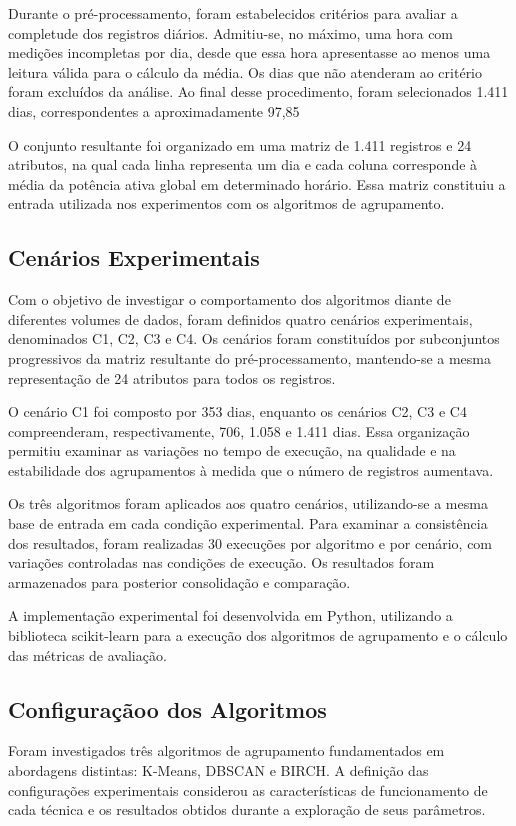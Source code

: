 \documentclass[lettersize,journal]{IEEEtran}
\begin{document}
Durante o pré-processamento, foram estabelecidos critérios para avaliar a completude dos registros diários. Admitiu-se, no máximo, uma hora com medições incompletas por dia, desde que essa hora apresentasse ao menos uma leitura válida para o cálculo da média. Os dias que não atenderam ao critério foram excluídos da análise. Ao final desse procedimento, foram selecionados 1.411 dias, correspondentes a aproximadamente 97,85%

O conjunto resultante foi organizado em uma matriz de 1.411 registros e 24 atributos, na qual cada linha representa um dia e cada coluna corresponde à média da potência ativa global em determinado horário. Essa matriz constituiu a entrada utilizada nos experimentos com os algoritmos de agrupamento.

\subsection{Cenários Experimentais}
Com o objetivo de investigar o comportamento dos algoritmos diante de diferentes volumes de dados, foram definidos quatro cenários experimentais, denominados C1, C2, C3 e C4. Os cenários foram constituídos por subconjuntos progressivos da matriz resultante do pré-processamento, mantendo-se a mesma representação de 24 atributos para todos os registros.

O cenário C1 foi composto por 353 dias, enquanto os cenários C2, C3 e C4 compreenderam, respectivamente, 706, 1.058 e 1.411 dias. Essa organização permitiu examinar as variações no tempo de execução, na qualidade e na estabilidade dos agrupamentos à medida que o número de registros aumentava.

Os três algoritmos foram aplicados aos quatro cenários, utilizando-se a mesma base de entrada em cada condição experimental. Para examinar a consistência dos resultados, foram realizadas 30 execuções por algoritmo e por cenário, com variações controladas nas condições de execução. Os resultados foram armazenados para posterior consolidação e comparação.

A implementação experimental foi desenvolvida em Python, utilizando a biblioteca scikit-learn para a execução dos algoritmos de agrupamento e o cálculo das métricas de avaliação.

\subsection{Configuraçãoo dos Algoritmos}
Foram investigados três algoritmos de agrupamento fundamentados em abordagens distintas: K-Means, DBSCAN e BIRCH. A definição das configurações experimentais considerou as características de funcionamento de cada técnica e os resultados obtidos durante a exploração de seus parâmetros.
\end{document}
